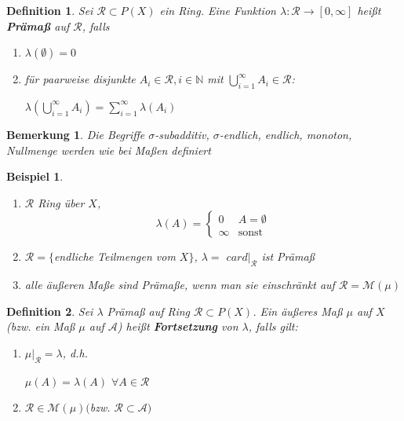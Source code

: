 \documentclass[11pt]{memoir}
\theoremstyle{changebreak}
\newtheorem{Definition}{Definition}[chapter]
\newtheorem{Bemerkung}{Bemerkung}[chapter]
\newtheorem{Beispiel}{Beispiel}[chapter]
\begin{document}
\begin{Definition}
Sei $\mathscr R \subset P(X)$ ein Ring. Eine Funktion $\lambda: \mathscr R \rightarrow [0, \infty]$ heißt \textbf{Prämaß} auf $\mathscr R$, falls
\begin{enumerate}
	\item $\lambda(\emptyset) = 0$
	\item für paarweise disjunkte $A_i \in \mathscr R, i \in \mathbb N$ mit $\bigcup\limits_{i=1}^\infty A_i \in \mathscr R$: 
	\begin{center}
		$\lambda \left(\bigcup\limits_{i=1}^\infty A_i\right) = \sum\limits_{i=1}^\infty \lambda(A_i)$
	\end{center}
\end{enumerate}
\end{Definition}

\begin{Bemerkung}
Die Begriffe $\sigma$-subadditiv, $\sigma$-endlich, endlich, monoton, Nullmenge werden wie bei Maßen definiert
\end{Bemerkung}

\begin{Beispiel}
\begin{enumerate}
	\item $\mathscr R$ Ring über $X$,
	\begin{equation}
	\lambda(A) =
		\begin{cases}
			0 & A = \emptyset \\
			\infty & \text{sonst}
		\end{cases}
	\end{equation}
	\item $\mathscr R = \{$endliche Teilmengen vom $X\}$, $\lambda = $ $card|_{\mathscr R}$ ist Prämaß
	\item alle äußeren Maße sind Prämaße, wenn man sie einschränkt auf $\mathscr R = \mathscr M(\mu)$
\end{enumerate}
\end{Beispiel}

\begin{Definition}
Sei $\lambda$ Prämaß auf Ring $\mathscr R \subset P(X)$. Ein äußeres Maß $\mu$ auf $X$ (bzw. ein Maß $\mu$ auf $\mathscr A$) heißt \textbf{Fortsetzung} von $\lambda$, falls gilt:
\begin{enumerate}
	\item $\mu|_\mathscr R = \lambda$, d.h. 
	\begin{center}
		$\mu(A) = \lambda(A)$ $\forall A \in \mathscr R$
	\end{center}
	\item $\mathscr R \in \mathscr M(\mu) ($bzw. $\mathscr R \subset \mathscr A)$
\end{enumerate}
\end{Definition}
\end{document}
